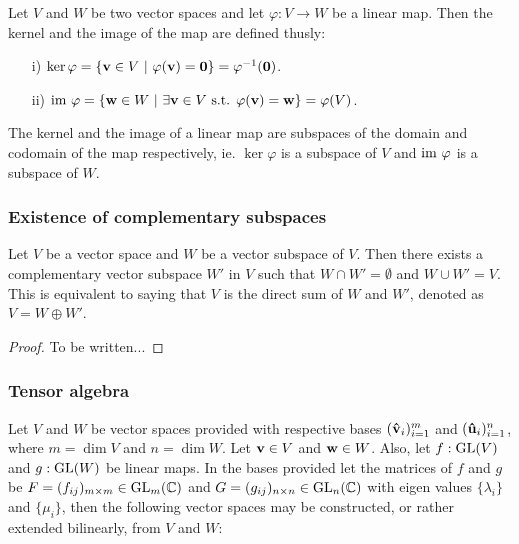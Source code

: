 	\begin{definition}\label{def:kernelimage}
		Let $V$ and $W$ be two vector spaces and let $\varphi: V \rightarrow W$ be a linear map. Then the kernel and the image of the map are defined thusly:
		\begin{itemize}
			\item[i)] $\ker \varphi = \left\lbrace \mathbf{v} \in V \ \middle\vert \ \varphi(\mathbf{v}) = \mathbf{0} \right\rbrace = \varphi^{-1}(\mathbf{0})$.
			\item[ii)] $\text{im } \varphi = \left\lbrace \mathbf{w} \in W \ \middle\vert \ \exists \mathbf{v} \in V \text{ s.t. } \varphi(\mathbf{v}) = \mathbf{w} \right\rbrace = \varphi(V)$.
		\end{itemize}
	\end{definition}
	
	\begin{remark}
		The kernel and the image of a linear map are subspaces of the domain and codomain of the map respectively, ie. $\ker \varphi$ is a subspace of $V$ and $\text{im } \varphi$ is a subspace of $W$.
	\end{remark}
	
	\subsubsection{Existence of complementary subspaces}
	
	\begin{corollary}\label{thm:compsubspaces}
		Let $V$ be a vector space and $W$ be a vector subspace of $V$. Then there exists a complementary vector subspace $W'$ in $V$ such that $W \cap W' = \emptyset$ and $W \cup W' = V$. This is equivalent to saying that $V$ is the direct sum of $W$ and $W'$, denoted as $V = W \oplus W'$.
	\end{corollary}
	\begin{proof}
		To be written...
	\end{proof}
	
	\subsubsection{Tensor algebra}\label{sect:tensoralgebra}
%	
%	
		Let $V$ and $W$ be vector spaces provided with respective bases $(\mathbf{\hat{v}}_i)_{i=1}^m$ and $(\mathbf{\hat{u}}_i)_{i=1}^n$, where $m = \dim V$ and $n = \dim W$. Let $\mathbf{v} \in V$ and $\mathbf{w} \in W$. Also, let $f: \text{GL}(V)$ and $g: \text{GL}(W)$ be linear maps. In the bases provided let the matrices of $f$ and $g$ be $F=(f_{ij})_{m \times m} \in \text{GL}_m(\mathbb{C})$ and $G = (g_{ij})_{n \times n} \in \text{GL}_n(\mathbb{C})$ with eigen values $\{\lambda_i\}$ and $\{\mu_i\}$, then the following vector spaces may be constructed, or rather extended bilinearly, from $V$ and $W$:
		
